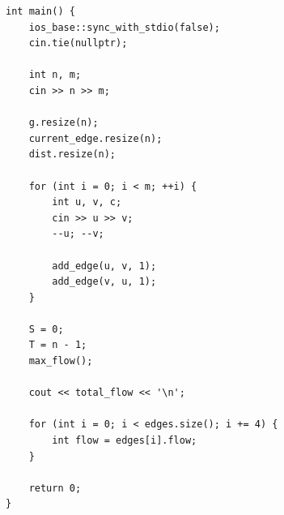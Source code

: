 \documentclass[a4paper, 10pt]{article}
\begin{document}
\begin{lstlisting}
int main() {
    ios_base::sync_with_stdio(false);
    cin.tie(nullptr);
    
    int n, m;
    cin >> n >> m;
    
    g.resize(n);
    current_edge.resize(n);
    dist.resize(n);
    
    for (int i = 0; i < m; ++i) {
        int u, v, c;
        cin >> u >> v;
        --u; --v;
        
        add_edge(u, v, 1);
        add_edge(v, u, 1);
    }
    
    S = 0;
    T = n - 1;
    max_flow();
    
    cout << total_flow << '\n';
    
    for (int i = 0; i < edges.size(); i += 4) {
        int flow = edges[i].flow;
    }
    
    return 0;
}
\end{lstlisting}
\end{document}
